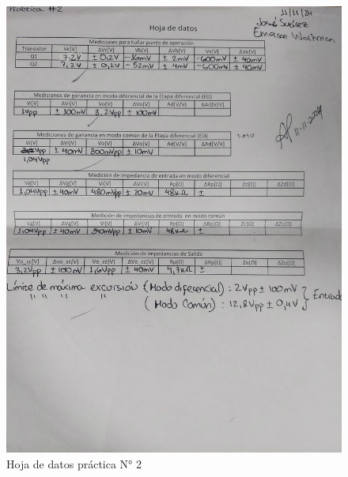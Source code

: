 \begin{figure}[ht]
    \centering
    \includegraphics[width=1.0\textwidth]{src/images/p2/p2-hoja-de-datos.jpg}
    \caption{Hoja de datos práctica N° 2}
    \label{fig:hoja-de-datos-p2}
\end{figure}

